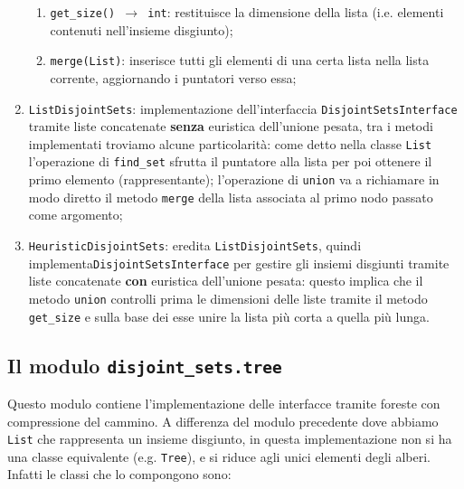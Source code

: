 \begin{enumerate}
\begin{enumerate}[resume]
                  \item \texttt{get\_size() $\rightarrow$ int}: restituisce la dimensione della lista (i.e. elementi
                        contenuti nell'insieme disgiunto);
                  \item \texttt{merge(List)}: inserisce tutti gli elementi di una certa lista nella lista corrente,
                        aggiornando i puntatori verso essa;
            \end{enumerate}
      \item \texttt{ListDisjointSets}: implementazione dell'interfaccia \texttt{DisjointSetsInterface} tramite liste concatenate
            \textbf{senza} euristica dell'unione pesata, tra i metodi
            implementati troviamo alcune particolarità: come detto nella classe \texttt{List} l'operazione di \texttt{find\_set}
            sfrutta il puntatore alla lista per poi ottenere il primo elemento (rappresentante); l'operazione di \texttt{union}
            va a richiamare in modo diretto il metodo \texttt{merge} della lista associata al primo nodo passato come argomento;\newpage
      \item \texttt{HeuristicDisjointSets}: eredita \texttt{ListDisjointSets}, quindi implementa\linebreak \texttt{DisjointSetsInterface}
            per gestire gli insiemi disgiunti tramite liste concatenate \textbf{con} euristica dell'unione pesata: questo implica
            che il metodo \texttt{union} controlli prima le dimensioni delle liste tramite il metodo \texttt{get\_size} e sulla base
            dei esse unire la lista più corta a quella più lunga.
\end{enumerate}

\subsection{Il modulo \texttt{disjoint\_sets.tree}}
Questo modulo contiene l'implementazione delle interfacce tramite foreste con compressione del cammino.
A differenza del modulo precedente dove abbiamo \texttt{List} che rappresenta un insieme disgiunto,
in questa implementazione non si ha una classe equivalente (e.g. \texttt{Tree}), e si riduce agli
unici elementi degli alberi. Infatti le classi che lo compongono sono:

